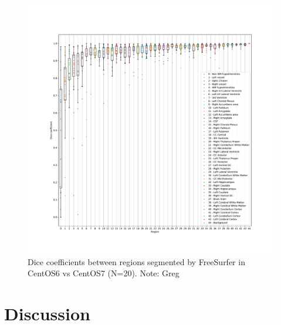 \documentclass[a4paper,num-refs]{oup-contemporary}
\newcommand{\note}[2]{\color{blue}Note: #1\color{black}}
\begin{document}
\begin{figure}
  \hspace*{-1cm}
  \includegraphics[width=1.2\linewidth]{figures/dice_regions.pdf}
    \caption{Dice coefficients between regions segmented by FreeSurfer in CentOS6 vs CentOS7 (N=20).
\note{Greg}{I don't think the legend is important here. Focus on having values legible and removing those which
don't really illustrate the "point".}}
    \label{fig:scatter_plot}
  \end{figure}

  

\section{Discussion}
\end{document}
